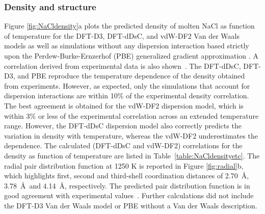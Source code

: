 \documentclass[preprint,3p,10pt,onecolumn,number,sort&compress]{elsarticle}
\begin{document}
{\subsubsection{Density and structure}
Figure \ref{fig:NaCldensity}a plots the predicted density of molten NaCl as function of temperature for the DFT-D3, DFT-dDsC, and vdW-DF2 Van der Waals models as well as simulations without any dispersion interaction based strictly upon the Perdew-Burke-Ernzerhof (PBE) generalized gradient approximation \cite{pbe}. A correlation derived from experimental data is also shown~\cite{Janz1988}. The DFT-dDsC, DFT-D3, and PBE reproduce the temperature dependence of the density obtained from experiments. However, as expected, only the simulations that account for dispersion interactions are within 10\% of the experimental density correlation. The best agreement is obtained for the vdW-DF2 dispersion model, which is within 3\% or less of the experimental correlation across an extended temperature range. However, the DFT-dDsC dispersion model also correctly predicts the variation in density with temperature, whereas the vdW-DF2 underestimates the dependence. The calculated (DFT-dDsC and vdW-DF2) correlations for the density as function of temperature are listed in Table~\ref{table:NaCldensityetc}. The radial pair distribution function at 1250 K is reported in Figure \ref{fig:radial}b, which highlights first, second and third-shell coordination distances of 2.70~\AA, 3.78~\AA~and 4.14~\AA, respectively. The predicted pair distribution function is in good agreement with experimental values~\cite{Edwards_1975}. Further calculations did not include the DFT-D3 Van der Waals model or PBE without a Van der Waals description.


}
\end{document}
